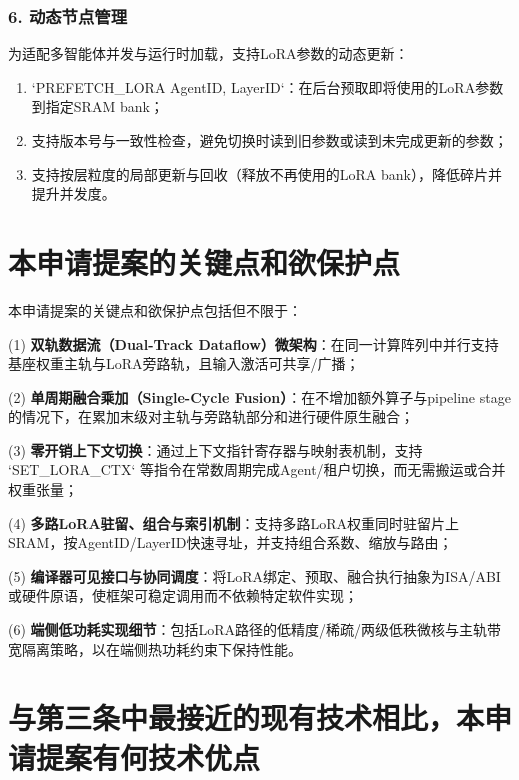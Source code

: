 \documentclass[12pt,a4paper]{article}
\begin{document}
\subsubsection{6. 动态节点管理}
为适配多智能体并发与运行时加载，支持LoRA参数的动态更新：
\begin{enumerate}
    \item `PREFETCH\_LORA AgentID, LayerID`：在后台预取即将使用的LoRA参数到指定SRAM bank；
    \item 支持版本号与一致性检查，避免切换时读到旧参数或读到未完成更新的参数；
    \item 支持按层粒度的局部更新与回收（释放不再使用的LoRA bank），降低碎片并提升并发度。
\end{enumerate}

\section{本申请提案的关键点和欲保护点}

本申请提案的关键点和欲保护点包括但不限于：

(1) \textbf{双轨数据流（Dual-Track Dataflow）微架构}：在同一计算阵列中并行支持基座权重主轨与LoRA旁路轨，且输入激活可共享/广播；

(2) \textbf{单周期融合乘加（Single-Cycle Fusion）}：在不增加额外算子与pipeline stage的情况下，在累加末级对主轨与旁路轨部分和进行硬件原生融合；

(3) \textbf{零开销上下文切换}：通过上下文指针寄存器与映射表机制，支持 `SET\_LORA\_CTX` 等指令在常数周期完成Agent/租户切换，而无需搬运或合并权重张量；

(4) \textbf{多路LoRA驻留、组合与索引机制}：支持多路LoRA权重同时驻留片上SRAM，按AgentID/LayerID快速寻址，并支持组合系数、缩放与路由；

(5) \textbf{编译器可见接口与协同调度}：将LoRA绑定、预取、融合执行抽象为ISA/ABI或硬件原语，使框架可稳定调用而不依赖特定软件实现；

(6) \textbf{端侧低功耗实现细节}：包括LoRA路径的低精度/稀疏/两级低秩微核与主轨带宽隔离策略，以在端侧热功耗约束下保持性能。

\section{与第三条中最接近的现有技术相比，本申请提案有何技术优点}
\end{document}
